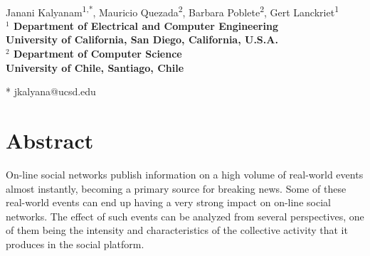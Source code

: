 \documentclass[10pt,letterpaper]{article}
\date{}
\begin{document}
\vspace*{0.35in}

\begin{flushleft}
{\Large
\textbf{}
}
\newline
\\
Janani Kalyanam\textsuperscript{1,*},
Mauricio Quezada\textsuperscript{2},
Barbara Poblete\textsuperscript{2},
Gert Lanckriet\textsuperscript{1}
\\
\bigskip
\bf{$^1$} Department of Electrical and Computer Engineering \\ University of California, San Diego, California, U.S.A.
\\
\bf{$^2$} Department of Computer Science \\ University of Chile, Santiago, Chile
\\
\bigskip

* jkalyana@ucsd.edu

\end{flushleft}
\section*{Abstract}

On-line social networks publish information on a high volume of
real-world events almost instantly, becoming a primary source for
breaking news.  Some of these real-world events can end up
having a very strong impact on on-line social networks.  The effect of such
events can be analyzed from several perspectives, one of them being
the intensity and characteristics of the collective activity that it
produces in the social platform.
\end{document}
